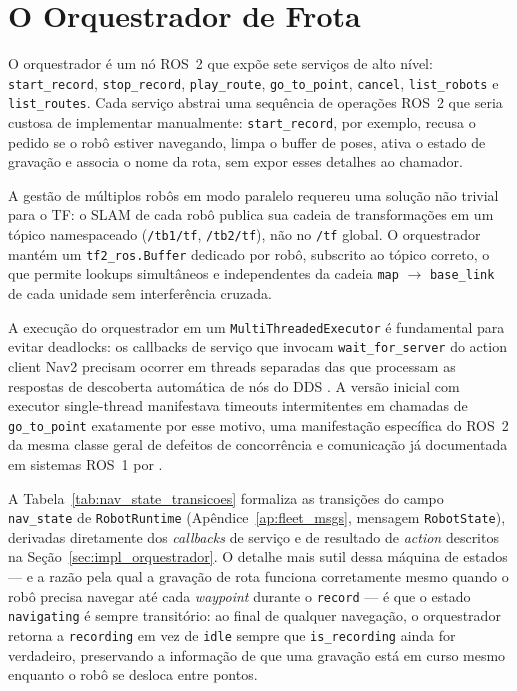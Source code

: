 \section{O Orquestrador de Frota}
\label{sec:orquestrador}

O orquestrador é um nó ROS~2 que expõe sete serviços de alto nível:
\texttt{start\_\allowbreak record}, \texttt{stop\_\allowbreak record}, \texttt{play\_\allowbreak route},
\texttt{go\_\allowbreak to\_\allowbreak point}, \texttt{cancel}, \texttt{list\_\allowbreak robots} e
\texttt{list\_\allowbreak routes}. Cada serviço abstrai uma sequência de operações ROS~2
que seria custosa de implementar manualmente: \texttt{start\_\allowbreak record}, por exemplo,
recusa o pedido se o robô estiver navegando, limpa o buffer de poses, ativa o
estado de gravação e associa o nome da rota, sem expor esses detalhes ao chamador.

A gestão de múltiplos robôs em modo paralelo requereu uma solução não trivial para
o TF: o SLAM de cada robô publica sua cadeia de transformações em um tópico
namespaceado (\texttt{/\allowbreak tb1/\allowbreak tf}, \texttt{/\allowbreak tb2/\allowbreak tf}), não no \texttt{/\allowbreak tf} global.
O orquestrador mantém um \texttt{tf2\_\allowbreak ros.Buffer} dedicado por robô, subscrito ao
tópico correto, o que permite lookups simultâneos e independentes da cadeia
\texttt{map} $\to$ \texttt{base\_\allowbreak link} de cada unidade sem interferência cruzada.

A execução do orquestrador em um \texttt{MultiThreadedExecutor} é fundamental para
evitar deadlocks: os callbacks de serviço que invocam \texttt{wait\_\allowbreak for\_\allowbreak server}
do action client Nav2 \cite{macenski2020marathon} precisam ocorrer em threads separadas das que processam
as respostas de descoberta automática de nós do DDS \cite{pardocastellote2003dds,macenski2022ros2}. A
versão inicial com executor single-thread manifestava timeouts intermitentes em
chamadas de \texttt{go\_\allowbreak to\_\allowbreak point} exatamente por esse motivo, uma
manifestação específica do ROS~2 da mesma classe geral de defeitos de
concorrência e comunicação já documentada em sistemas ROS~1 por
.

A Tabela~\ref{tab:nav_state_transicoes} formaliza as transições do campo
\texttt{nav\_\allowbreak state} de \texttt{RobotRuntime} (Apêndice~\ref{ap:fleet_msgs}, mensagem
\texttt{RobotState}), derivadas diretamente dos \textit{callbacks} de serviço e de
resultado de \textit{action} descritos na Seção~\ref{sec:impl_orquestrador}. O
detalhe mais sutil dessa máquina de estados --- e a razão pela qual a gravação
de rota funciona corretamente mesmo quando o robô precisa navegar até cada
\textit{waypoint} durante o \texttt{record} --- é que o estado \texttt{navigating}
é sempre transitório: ao final de qualquer navegação, o orquestrador retorna a
\texttt{recording} em vez de \texttt{idle} sempre que \texttt{is\_\allowbreak recording} ainda
for verdadeiro, preservando a informação de que uma gravação está em curso mesmo
enquanto o robô se desloca entre pontos.

